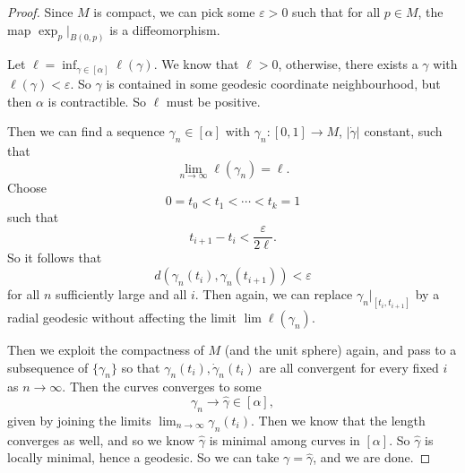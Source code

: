 \documentclass[a4paper]{article}
\begin{document}
\begin{proof}
  Since $M$ is compact, we can pick some $\varepsilon > 0$ such that for all $p \in M$, the map $\exp_p |_{B(0, p)}$ is a diffeomorphism.

  Let $\ell = \inf_{\gamma \in [\alpha]} \ell(\gamma)$. We know that $\ell > 0$, otherwise, there exists a $\gamma$ with $\ell(\gamma) < \varepsilon$. So $\gamma$ is contained in some geodesic coordinate neighbourhood, but then $\alpha$ is contractible. So $\ell$ must be positive.

  Then we can find a sequence $\gamma_n \in [\alpha]$ with $\gamma_n: [0, 1] \to M$, $|\dot{\gamma}|$ constant, such that
  \[
    \lim_{n \to \infty} \ell(\gamma_n) = \ell.
  \]
  Choose
  \[
    0 = t_0 < t_1 < \cdots < t_k = 1
  \]
  such that
  \[
    t_{i + 1} - t_i < \frac{\varepsilon}{2 \ell}.
  \]
  So it follows that
  \[
    d(\gamma_n(t_i), \gamma_n(t_{i + 1})) < \varepsilon
  \]
  for all $n$ sufficiently large and all $i$. Then again, we can replace $\gamma_n|_{[t_i, t_{i + 1}]}$ by a radial geodesic without affecting the limit $\lim \ell(\gamma_n)$.

  Then we exploit the compactness of $M$ (and the unit sphere) again, and pass to a subsequence of $\{\gamma_n\}$ so that $\gamma_n(t_i), \dot{\gamma}_n (t_i)$ are all convergent for every fixed $i$ as $n \to \infty$. Then the curves converges to some
  \[
    \gamma_n \to \hat{\gamma} \in [\alpha],
  \]
  given by joining the limits $\lim_{n \to \infty} \gamma_n(t_i)$. Then we know that the length converges as well, and so we know $\hat{\gamma}$ is minimal among curves in $[\alpha]$. So $\hat{\gamma}$ is locally minimal, hence a geodesic. So we can take $\gamma = \hat{\gamma}$, and we are done.
\end{proof}
\end{document}
